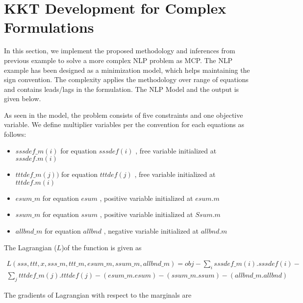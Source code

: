 \documentclass{article}
\begin{document}
\section{KKT Development for Complex Formulations}

In this section, we implement the proposed methodology and inferences from previous example to solve a more complex NLP problem as MCP.
The NLP example has been designed as a minimization model, which helps maintaining the sign convention. The complexity applies the methodology
over range of equations and contains leads/lags in the formulation. The NLP Model and the output is given below.






As seen in the model, the problem consists of five constraints and one objective variable. We define multiplier variables per the convention for each equations as follows:
\renewcommand\labelitemi{\tiny$\bullet$}
\begin{itemize}
	\item $sssdef\_m(i)$ for equation $sssdef(i)$ , free variable initialized at $sssdef.m(i)$
	\item $tttdef\_m(j))$ for equation $tttdef(j)$    , free variable initialized at $tttdef.m(i)$
	\item $esum\_m$ for equation $esum$		, positive variable initialized at $esum.m$
	\item $ssum\_m$ for equation $ssum$		, positive variable  initialized at $Ssum.m$
	\item $allbnd\_m$ for equation $allbnd$	, negative variable initialized at $allbnd.m$
\end{itemize}

The Lagrangian ($L$)of the function is given as

\begin{equation}
  \begin{aligned}
	L (sss,ttt,x,sss\_m,ttt\_m,esum\_m,ssum\_m,allbnd\_m) = obj - \sum_{i} sssdef\_m(i) . sssdef(i) - \\
   \sum_{j} tttdef\_m(j) . tttdef(j) - (esum\_m . esum) - (ssum\_m . ssum) - (allbnd\_m . allbnd)
 \end{aligned}
\end{equation}

The gradients of Lagrangian with respect to the marginals are
\end{document}
